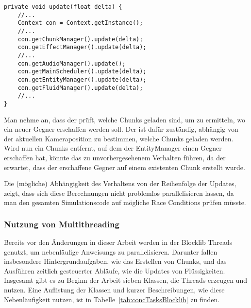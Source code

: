 \begin{lstlisting}[caption={Vereinfachte Update-Methode von \class{Game}.}, label={lst:gameUpdate},float={htbp}]
private void update(float delta) {
	//...
	Context con = Context.getInstance();
	//...
	con.getChunkManager().update(delta);
	con.getEffectManager().update(delta);
	//...
	con.getAudioManager().update();
	con.getMainScheduler().update(delta);
	con.getEntityManager().update(delta);
	con.getFluidManager().update(delta);
	//...
}
\end{lstlisting}

\begin{example}
Man nehme an, dass der  prüft, welche Chunks geladen sind, um zu ermitteln, wo ein neuer Gegner erschaffen werden soll. Der  ist dafür zuständig, abhängig von der aktuellen Kameraposition zu bestimmen, welche Chunks geladen werden. Wird nun ein Chunks entfernt, auf dem der EntityManager einen Gegner erschaffen hat, könnte das zu unvorhergesehenem Verhalten führen, da der  erwartet, dass der erschaffene Gegner auf einem existenten Chunk erstellt wurde.
\end{example}

Die (mögliche) Abhängigkeit des Verhaltens von der Reihenfolge der Updates, zeigt, dass sich diese Berechnungen nicht problemlos parallelisieren lassen, da man den gesamten Simulationscode auf mögliche Race Conditions prüfen müsste.


\subsubsection{Nutzung von Multithreading}\label{sec:nutzungMultithreading}
Bereits vor den Änderungen in dieser Arbeit werden in der Blocklib Threads genutzt, um nebenläufige \glspl{Anweisung} zu parallelisieren. Darunter fallen insbesondere Hintergrundaufgaben, wie das Erstellen von Chunks, und das Ausführen zeitlich gesteuerter Abläufe, wie die Updates von Flüssigkeiten. Insgesamt gibt es zu Beginn der Arbeit sieben Klassen, die Threads erzeugen und nutzen. Eine Auflistung der Klassen und kurzer Beschreibungen, wie diese Nebenläufigkeit nutzen, ist in Tabelle~\ref{tab:concTasksBlocklib} zu finden.

